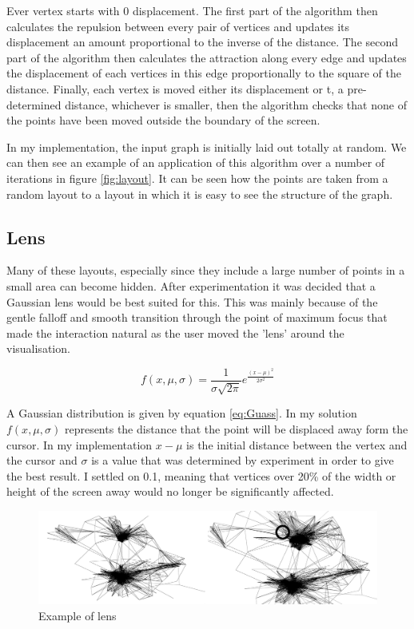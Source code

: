 \documentclass[12pt,a4paper]{article}
\begin{document}
Ever vertex starts with 0 displacement. The first part of the algorithm then calculates the repulsion between every pair of vertices and updates its displacement an amount proportional to the inverse of the distance. The second part of the algorithm then calculates the attraction along every edge and updates the displacement of each vertices in this edge proportionally to the square of the distance. Finally, each vertex is moved either its displacement or t, a pre-determined distance, whichever is smaller, then the algorithm checks that none of the points have been moved outside the boundary of the screen.

In my implementation, the input graph is initially laid out totally at random. We can then see an example of an application of this algorithm over a number of iterations in figure \ref{fig:layout}. It can be seen how the points are taken from a random layout to a layout in which it is easy to see the structure of the graph.

\subsection{Lens}

Many of these layouts, especially since they include a large number of points in a small area can become hidden. After experimentation it was decided that a Gaussian lens would be best suited for this. This was mainly because of the gentle falloff and smooth transition through the point of maximum focus that made the interaction natural as the user moved the 'lens' around the visualisation.

\begin{equation}
\label{eq:Guass}
f(x,\mu,\sigma)=\frac{1}{\sigma\sqrt{2\pi}}e^{\frac{(x-\mu)^{2}}{2\sigma^{2}}}
\end{equation}

A Gaussian distribution is given by equation \ref{eq:Guass}. In my solution $f(x, \mu, \sigma)$ represents the distance that the point will be displaced away form the cursor. In my implementation $x-\mu$ is the initial distance between the vertex and the cursor and $\sigma$ is a value that was determined by experiment in order to give the best result. I settled on 0.1, meaning that vertices over 20\% of the width or height of the screen away would no longer be significantly affected.

\begin{figure}[htb]
\caption{Example of lens}
\label{fig:lens}
\begin{center}
\includegraphics[scale=0.12]{Gaussian.png}
\end{center}
\end{figure}
\end{document}
